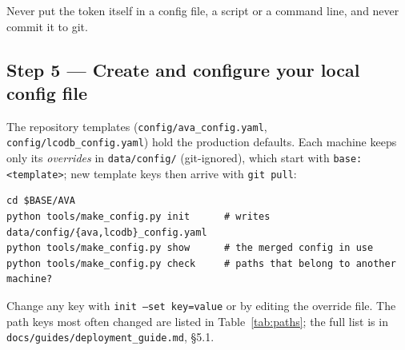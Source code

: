 \documentclass[12pt,a4paper]{article}
\begin{document}
\begin{warnbox}
Never put the token itself in a config file, a script or a command line, and never commit it to git.
\end{warnbox}

\subsection{Step 5 --- Create and configure your local config file}

The repository templates (\texttt{config/ava\_config.yaml}, \texttt{config/lcodb\_config.yaml}) hold the
production defaults.  Each machine keeps only its \emph{overrides} in \texttt{data/config/} (git-ignored),
which start with \texttt{base: <template>}; new template keys then arrive with \texttt{git pull}:
\begin{lstlisting}[style=shell]
cd $BASE/AVA
python tools/make_config.py init      # writes data/config/{ava,lcodb}_config.yaml
python tools/make_config.py show      # the merged config in use
python tools/make_config.py check     # paths that belong to another machine?
\end{lstlisting}

Change any key with \texttt{init --set key=value} or by editing the override file.  The path keys most
often changed are listed in Table~\ref{tab:paths}; the full list is in
\texttt{docs/guides/deployment\_guide.md}, \S5.1.
\end{document}
